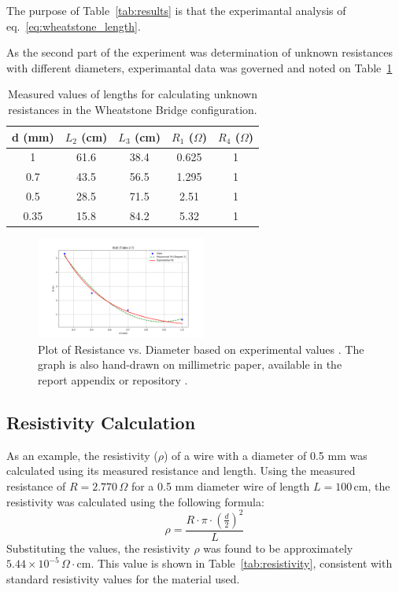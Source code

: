 \documentclass[journal]{IEEEtran}
\begin{document}
The purpose of Table~\ref{tab:results} is that the experimantal analysis of eq.~\ref{eq:wheatstone_length}. 

As the second part of the experiment was determination of unknown resistances 
with different diameters, experimantal data was governed and noted on Table~\ref{tab:results_part2}

\begin{table}[H]
    \centering
    \begin{tabular}{ccccc}
    \hline
    d (mm) & $L_2$ (cm) & $L_3$ (cm) & $R_1$ ($\Omega$) & $R_4$ ($\Omega$) \\
    \hline
    1 & 61.6 & 38.4 & 0.625 & 1\\
    0.7 & 43.5 & 56.5 & 1.295 & 1\\
    0.5 & 28.5 & 71.5 & 2.51 & 1\\
    0.35 & 15.8 & 84.2 & 5.32 & 1\\
    \hline
    \end{tabular}
    \caption{Measured values of lengths for calculating unknown resistances in the Wheatstone Bridge configuration.}
    \label{tab:results_part2}
\end{table}

\begin{figure}[H]
    \centering
    \includegraphics[width=0.5\textwidth]{output_plots/resistance_vs_diameter_table_2_7.png} %
    \caption{Plot of Resistance vs. Diameter based on experimental values \cite{lab_manual}. The graph is also hand-drawn on millimetric paper, available in the report appendix or repository \cite{graphonmillimetricpaper}.}
    \label{fig:resistance_vs_diameter}
\end{figure}

\subsection{Resistivity Calculation}
As an example, the resistivity (\(\rho\)) of a wire with a diameter of 0.5 mm was calculated using its measured resistance and length. Using the measured resistance of \( R = 2.770 \, \Omega \) for a 0.5 mm diameter wire of length \( L = 100 \, \text{cm} \), the resistivity was calculated using the following formula:
\[
\rho = \frac{R \cdot \pi \cdot \left(\frac{d}{2}\right)^2}{L}
\]
Substituting the values, the resistivity \(\rho\) was found to be approximately \(5.44 \times 10^{-5} \, \Omega \cdot \text{cm}\). This value is shown in Table~\ref{tab:resistivity}, consistent with standard resistivity values for the material used.
\end{document}

